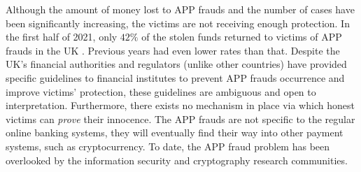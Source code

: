 Although the amount of money lost to  APP frauds and the number of cases have been significantly  increasing, the victims are not receiving  enough protection.  In the first half of 2021, only $42\%$ of the stolen funds returned to victims of  APP frauds in the UK \cite{2021-Half-Year-Fraud-Update}. Previous years had even lower rates than that. Despite  the UK's financial authorities and regulators (unlike other countries) have provided specific guidelines to financial institutes to prevent  APP frauds occurrence and improve victims' protection, these guidelines are  ambiguous and    open to interpretation. Furthermore,  there exists  no  mechanism in place via which honest victims can  \emph{prove} their innocence. The APP frauds are not specific to the regular online banking systems, they will eventually find their way into other payment systems, such as cryptocurrency. To date, the APP fraud problem has been overlooked by the information security and cryptography research communities.


